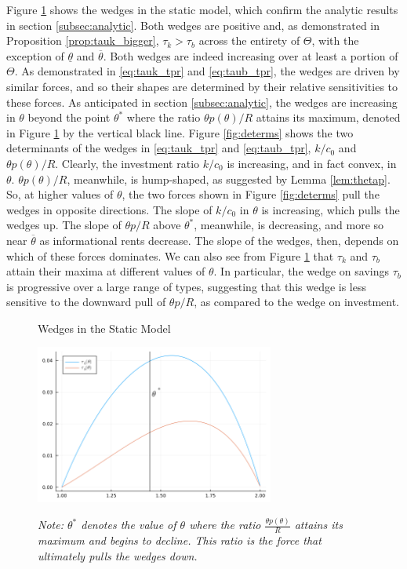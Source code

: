 \documentclass[11pt]{article}
\begin{document}
Figure \ref{fig:static_wedges} shows the wedges in the static model, which confirm the analytic results in section \ref{subsec:analytic}. Both wedges are positive and, as demonstrated in Proposition \ref{prop:tauk_bigger}, \( \tau_k>\tau_b \) across the entirety of \( \Theta \), with the exception of \( \underline{\theta} \) and \( \overline{\theta} \). Both wedges are indeed increasing over at least a portion of \( \Theta \). As demonstrated in \eqref{eq:tauk_tpr} and \eqref{eq:taub_tpr}, the wedges are driven by similar forces, and so their shapes are determined by their relative sensitivities to these forces. As anticipated in section \ref{subsec:analytic}, the wedges are increasing in \( \theta \) beyond the point \( \theta^* \) where the ratio \( \theta p\left( \theta \right)/R \) attains its maximum, denoted in Figure \ref{fig:static_wedges} by the vertical black line. Figure \ref{fig:determs} shows the two determinants of the wedges in \eqref{eq:tauk_tpr} and \eqref{eq:taub_tpr}, \( k/c_0 \) and \( \theta p(\theta) / R \). Clearly, the investment ratio \( k/c_0 \) is increasing, and in fact convex, in \( \theta \). \( \theta p(\theta) / R \), meanwhile, is hump-shaped, as suggested by Lemma \ref{lem:thetap}. So, at higher values of \( \theta \), the two forces shown in Figure \ref{fig:determs} pull the wedges in opposite directions. The slope of \( k/c_0 \) in \( \theta \) is increasing, which pulls the wedges up. The slope of \( \theta p/R \) above \( \theta^* \), meanwhile, is decreasing, and more so near \( \overline{\theta} \) as informational rents decrease. The slope of the wedges, then, depends on which of these forces dominates. We can also see from Figure \ref{fig:static_wedges} that \( \tau_k \) and \( \tau_b \) attain their maxima at different values of \( \theta \). In particular, the wedge on savings \( \tau_b \) is progressive over a large range of types, suggesting that this wedge is less sensitive to the downward pull of \( \theta p / R \), as compared to the wedge on investment.

\begin{figure}[htbp]
    \centering
    \caption{Wedges in the Static Model}
    \includegraphics[width = 0.7\textwidth]{figures/wedges.png}
    \label{fig:static_wedges}
    \caption*{\textit{Note: \( \theta^* \) denotes the value of \( \theta \) where the ratio \( \frac{\theta p\left( \theta \right)}{R} \) attains its maximum and begins to decline. This ratio is the force that ultimately pulls the wedges down.}}
\end{figure}
\end{document}
